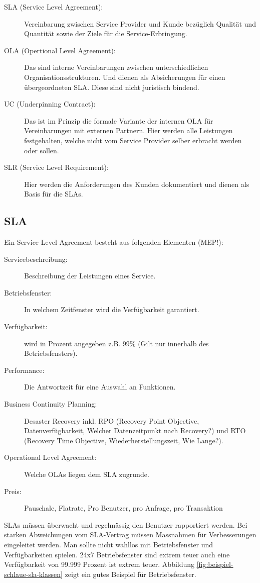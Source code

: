 \begin{description}
	\item[SLA (Service Level Agreement):] Vereinbarung zwischen Service Provider und Kunde bezüglich Qualität und Quantität sowie der Ziele für die Service-Erbringung.
	\item[OLA (Opertional Level Agreement):] Das sind interne Vereinbarungen zwischen unterschiedlichen Organisationsstrukturen. Und dienen als Absicherungen für einen übergeordneten SLA. Diese sind nicht juristisch bindend.
	\item[UC (Underpinning Contract):] Das ist im Prinzip die formale Variante der internen OLA für Vereinbarungen mit externen Partnern. Hier werden alle Leistungen festgehalten, welche nicht vom Service Provider selber erbracht werden oder sollen.
	\item[SLR (Service Level Requirement):] Hier werden die Anforderungen des Kunden dokumentiert und dienen als Basis für die SLAs.
\end{description}

\subsection{SLA}

Ein Service Level Agreement besteht aus folgenden Elementen (MEP!):

\begin{description}
	\item[Servicebeschreibung:] Beschreibung der Leistungen eines Service.
	\item[Betriebsfenster:] In welchem Zeitfenster wird die Verfügbarkeit garantiert.
	\item[Verfügbarkeit:] wird in Prozent angegeben z.B. 99\% (Gilt nur innerhalb des Betriebsfensters).
	\item[Performance:] Die Antwortzeit für eine Auswahl an Funktionen.
	\item[Business Continuity Planning:] Desaster Recovery inkl. RPO (Recovery Point Objective, Datenverfügbarkeit, Welcher Datenzeitpunkt nach Recovery?) und RTO (Recovery Time Objective, Wiederherstellungszeit, Wie Lange?).
	\item[Operational Level Agreement:] Welche OLAs liegen dem SLA zugrunde.
	\item[Preis:] Pauschale, Flatrate, Pro Benutzer, pro Anfrage, pro Transaktion
\end{description}

SLAs müssen überwacht und regelmässig den Benutzer rapportiert werden. Bei starken Abweichungen vom SLA-Vertrag müssen Massnahmen für Verbesserungen eingeleitet werden. Man sollte nicht wahllos mit Betriebsfenster und Verfügbarkeiten spielen. 24x7 Betriebsfenster sind extrem teuer auch eine Verfügbarkeit von 99.999 Prozent ist extrem teuer. Abbildung \ref{fig:beispiel-schlaue-sla-klassen} zeigt ein gutes Beispiel für Betriebsfenster.

